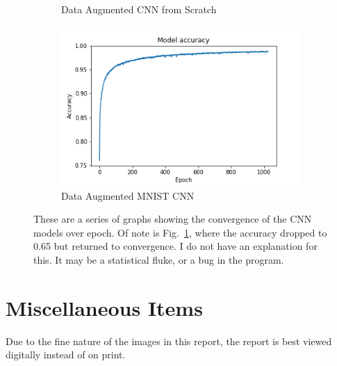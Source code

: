 \documentclass[a4paper,fleqn,usenatbib]{mnras}
\begin{document}
\begin{figure}
\begin{subfigure}{\columnwidth}
 \caption{Data Augmented CNN from Scratch}
 \label{fig:CNN_Augment_Self}
 \end{subfigure}
  \begin{subfigure}{\columnwidth}
 \includegraphics[width=\columnwidth]{../Figures/CNN_Augment_MNIST}
 \caption{Data Augmented MNIST CNN}
 \label{fig:CNN_Augment_MNIST}
 \end{subfigure}

 \caption{These are a series of graphs showing the convergence of the CNN models over epoch. Of note is Fig.~\ref{fig:CNN_Augment_Self}, where the accuracy dropped to 0.65 but returned to convergence. I do not have an explanation for this. It may be a statistical fluke, or a bug in the program.}
 \label{fig:Examples}
 \end{figure}


\section{Miscellaneous Items}
\label{Misc}
Due to the fine nature of the images in this report, the report is best viewed digitally instead of on print. 

\bsp	%
\label{lastpage}
\end{document}
